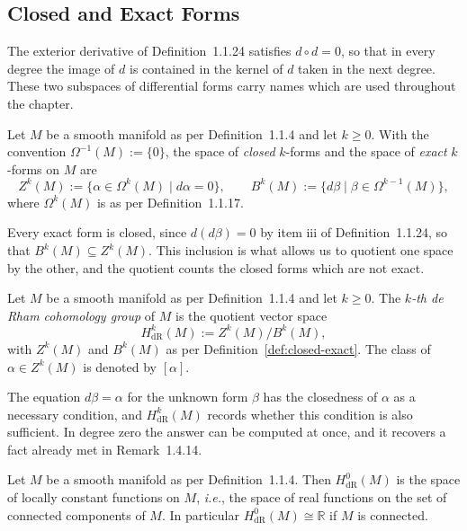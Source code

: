\subsection{Closed and Exact Forms}\label{subsec:de-rham}

The exterior derivative of Definition~1.1.24 satisfies $d\circ d=0$, so that in every degree the image of $d$ is contained in the kernel of $d$ taken in the next degree. These two subspaces of differential forms carry names which are used throughout the chapter.

\begin{definition}\label{def:closed-exact}
	Let $M$ be a smooth manifold as per Definition~1.1.4 and let $k\geq0$. With the convention $\Omega^{-1}(M):=\{0\}$, the space of \emph{closed} $k$-forms and the space of \emph{exact} $k$-forms on $M$ are
	\begin{equation*}
		Z^k(M):=\{\alpha\in\Omega^k(M)\mid d\alpha=0\}, \qquad B^k(M):=\{d\beta\mid\beta\in\Omega^{k-1}(M)\},
	\end{equation*}
	where $\Omega^k(M)$ is as per Definition~1.1.17.
\end{definition}

Every exact form is closed, since $d(d\beta)=0$ by item iii of Definition~1.1.24, so that $B^k(M)\subseteq Z^k(M)$. This inclusion is what allows us to quotient one space by the other, and the quotient counts the closed forms which are not exact.

\begin{definition}\label{def:de-rham}
	Let $M$ be a smooth manifold as per Definition~1.1.4 and let $k\geq0$. The \emph{$k$-th de Rham cohomology group} of $M$ is the quotient vector space
	\begin{equation*}
		H^k_{\mathrm{dR}}(M):=Z^k(M)/B^k(M),
	\end{equation*}
	with $Z^k(M)$ and $B^k(M)$ as per Definition~\ref{def:closed-exact}. The class of $\alpha\in Z^k(M)$ is denoted by $[\alpha]$.
\end{definition}

The equation $d\beta=\alpha$ for the unknown form $\beta$ has the closedness of $\alpha$ as a necessary condition, and $H^k_{\mathrm{dR}}(M)$ records whether this condition is also sufficient. In degree zero the answer can be computed at once, and it recovers a fact already met in Remark~1.4.14.

\begin{proposition}\label{prop:H0}
	Let $M$ be a smooth manifold as per Definition~1.1.4. Then $H^0_{\mathrm{dR}}(M)$ is the space of locally constant functions on $M$, \textit{i.e.}, the space of real functions on the set of connected components of $M$. In particular $H^0_{\mathrm{dR}}(M)\cong\mathbb{R}$ if $M$ is connected.
\end{proposition}

